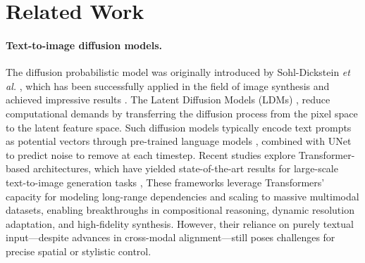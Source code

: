 \section{Related Work}
\label{sec:formatting}
\paragraph{Text-to-image diffusion models.}
The diffusion probabilistic model was originally introduced by Sohl-Dickstein \textit{et al.} \cite{sohl2015deep}, which has been successfully applied in the field of image synthesis and achieved impressive results \cite{dhariwal2021diffusion, kingma2021variational, huang2023composer, huang2023reversion, jiang2023avatarcraft, ren2022image}. The Latent Diffusion Models (LDMs) \cite{rombach2022high}, reduce computational demands by transferring the diffusion process from the pixel space to the latent feature space. Such diffusion models \cite{SD1.5, nichol2021glide, podell2023sdxl, rombach2022high, saharia2022photorealistic} typically encode text prompts as potential vectors through pre-trained language models \cite{radford2021learning, raffel2020exploring}, combined with UNet \cite{ronneberger2015u} to predict noise to remove at each timestep. Recent studies explore Transformer-based architectures, which have yielded state-of-the-art results for large-scale text-to-image generation tasks \cite{bao2023all, bao2023one, peebles2023scalable, tu2022maxvit, esser2024scaling}, These frameworks leverage Transformers’ capacity for modeling long-range dependencies and scaling to massive multimodal datasets, enabling breakthroughs in compositional reasoning, dynamic resolution adaptation, and high-fidelity synthesis. However, their reliance on purely textual input—despite advances in cross-modal alignment—still poses challenges for precise spatial or stylistic control.

